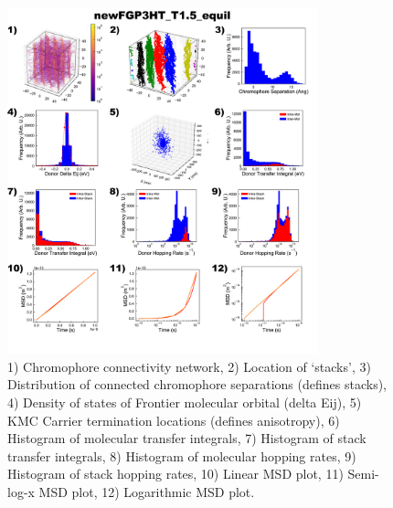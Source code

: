 \documentclass[12pt]{article}
\begin{document}
\begin{figure}[h]\centering
	\includegraphics[width=0.80\textwidth]{Figures/newFGP3HT_T1.5_equil.png}
    \caption{   1) Chromophore connectivity network, 
                2) Location of `stacks', 
                3) Distribution of connected chromophore separations (defines stacks),
                4) Density of states of Frontier molecular orbital (delta Eij),
                5) KMC Carrier termination locations (defines anisotropy),
                6) Histogram of molecular transfer integrals,
                7) Histogram of stack transfer integrals,
                8) Histogram of molecular hopping rates,
                9) Histogram of stack hopping rates,
                10) Linear MSD plot,
                11) Semi-log-x MSD plot,
                12) Logarithmic MSD plot.}
	\label{fig:EqlT1.5}
\end{figure}
\end{document}
